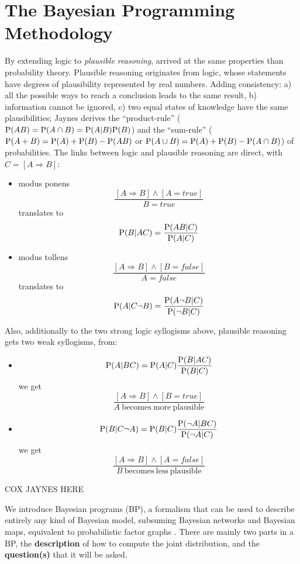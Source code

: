\section{The Bayesian Programming Methodology}
By extending logic to \textit{plausible reasoning}, \cite{Jaynes} arrived at the same properties than \cite{Komogorov33} probability theory. Plausible reasoning originates from logic, whose statements have degrees of plausibility represented by real numbers. %
Adding consistency: a) all the possible ways to reach a conclusion leads to the same result, b) information cannot be ignored, c) two equal states of knowledge have the same plausibilities; Jaynes derives the ``product-rule'' ($\mathrm{P}(AB)=\mathrm{P}(A\cap B)=\mathrm{P}(A|B)\mathrm{P}(B)$) and the ``sum-rule'' ($\mathrm{P}(A+B)=\mathrm{P}(A)+\mathrm{P}(B)-\mathrm{P}(AB)$ or $\mathrm{P}(A\cup B) = \mathrm{P}(A)+\mathrm{P}(B)-\mathrm{P}(A\cap B)$) of probabilities. The links between logic and plausible reasoning are direct, with $C=[A\Rightarrow B]$:
\begin{itemize}
    \item modus ponens $$\frac{[A\Rightarrow B] \wedge [A=true]}{B=true}$$ translates to $$\mathrm{P}(B|AC)=\frac{\mathrm{P}(AB|C)}{\mathrm{P}(A|C)}$$
    \item modus tollens $$\frac{[A\Rightarrow B] \wedge [B=false]}{A=false}$$ translates to $$\mathrm{P}(A|C\neg B)=\frac{\mathrm{P}(A \neg B|C)}{\mathrm{P}(\neg B|C)}$$
\end{itemize}
Also, additionally to the two strong logic syllogisms above, plausible reasoning gets two weak syllogisms, from:
\begin{itemize}
    \item $$\mathrm{P}(A|BC)=\mathrm{P}(A|C)\frac{\mathrm{P}(B|AC)}{\mathrm{P}(B|C)}$$ we get $$\frac{[A\Rightarrow B] \wedge [B=true]}{A\ \mathrm{becomes\ more\ plausible}}$$
    \item $$\mathrm{P}(B| C\neg A)=\mathrm{P}(B|C)\frac{\mathrm{P}(\neg A|BC)}{\mathrm{P}(\neg A|C)}$$ we get $$\frac{[A\Rightarrow B] \wedge [A=false]}{B\ \mathrm{becomes\ less\ plausible}}$$
\end{itemize}


COX JAYNES HERE


We introduce Bayesian programs (BP), a formalism that can be used to describe entirely any kind of Bayesian model, subsuming Bayesian networks and Bayesian maps, equivalent to probabilistic factor graphs \cite{Diard03}. 
There are mainly two parts in a BP, the \textbf{description} of how to compute the joint distribution, and the \textbf{question(s)} that it will be asked. 

